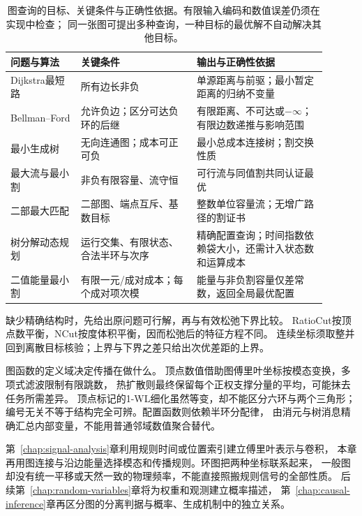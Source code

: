 \begin{table}[htbp]
  \centering
  \caption{图查询的目标、关键条件与正确性依据。有限输入编码和数值误差仍须在实现中检查；
  同一张图可提出多种查询，一种目标的最优解不自动解决其他目标。}
  \label{tab:graph-algorithm-conditions}
  \begin{tabular}{p{0.20\linewidth}p{0.33\linewidth}p{0.37\linewidth}}
    \toprule
    问题与算法 & 关键条件 & 输出与正确性依据\\
    \midrule
    Dijkstra最短路 & 所有边长非负 & 单源距离与前驱；最小暂定距离的归纳不变量\\
    Bellman--Ford & 允许负边；区分可达负环的后继 & 有限距离、不可达或\(-\infty\)；
      有限边数递推与影响范围\\
    最小生成树 & 无向连通图；成本可正可负 & 最小总成本连接树；割交换性质\\
    最大流与最小割 & 非负有限容量、流守恒 & 可行流与同值割共同认证最优\\
    二部最大匹配 & 二部图、端点互斥、基数目标 & 整数单位容量流；无增广路径的割证书\\
    树分解动态规划 & 运行交集、有限状态、合法半环与次序 &
      精确配置查询；时间指数依赖袋大小，还需计入状态数和运算成本\\
    二值能量最小割 & 有限一元/成对成本；每个成对项次模 &
      能量与非负割容量仅差常数，返回全局最优配置\\
    \bottomrule
  \end{tabular}
\end{table}

缺少精确结构时，先给出原问题可行解，再与有效松弛下界比较。
RatioCut按顶点数平衡，NCut按度体积平衡，因而松弛后的特征方程不同。
连续坐标须取整并回到离散目标核验；上界与下界之差只给出次优差距的上界。

图函数的定义域决定传播在做什么。
顶点数值借助图傅里叶坐标按模态变换，多项式滤波限制有限跳数，
热扩散则最终保留每个正权支撑分量的平均，可能抹去任务所需差异。
顶点标记的1-WL细化虽然等变，却不能区分六环与两个三角形；
编号无关不等于结构完全可辨。配置函数则依赖半环分配律，
由消元与树消息精确汇总内部变量，不能用普通邻域数值聚合替代。

第~\ref{chap:signal-analysis}章利用规则时间或位置索引建立傅里叶表示与卷积，
本章再用图连接与沿边能量选择模态和传播规则。环图把两种坐标联系起来，
一般图却没有统一平移或天然一致的物理频率，不能直接照搬规则信号的全部性质。
后续第~\ref{chap:random-variables}章将为权重和观测建立概率描述，
第~\ref{chap:causal-inference}章再区分图的分离判据与概率、生成机制中的独立关系。
